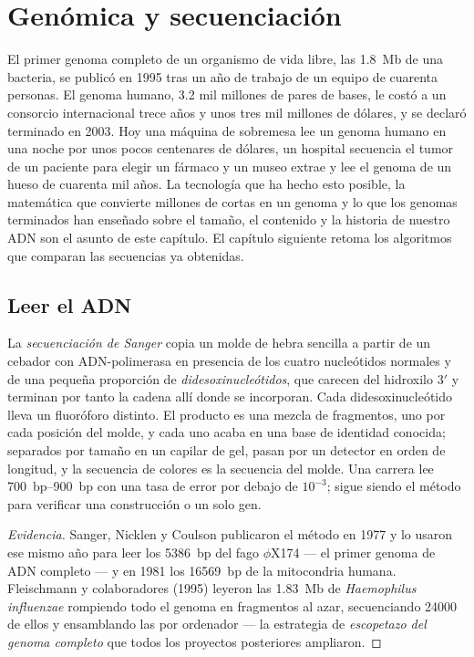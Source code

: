 \chapter{Genómica y secuenciación}\label{ch:b3:genomics}

El primer genoma completo de un organismo de vida libre, las
\qty{1.8}{Mb} de una bacteria, se publicó en 1995 tras un año de trabajo
de un equipo de cuarenta personas. El genoma humano, \num{3.2} mil
millones de pares de bases, le costó a un consorcio internacional trece
años y unos tres mil millones de dólares, y se declaró terminado en 2003.
Hoy una máquina de sobremesa lee un genoma humano en una noche por unos
pocos centenares de dólares, un hospital secuencia el tumor de un
paciente para elegir un fármaco y un museo extrae y lee el genoma de un
hueso de cuarenta mil años. La tecnología que ha hecho esto posible, la
matemática que convierte millones de  cortas en un genoma y lo
que los genomas terminados han enseñado sobre el tamaño, el contenido y
la historia de nuestro ADN son el asunto de este capítulo. El capítulo
siguiente retoma los algoritmos que comparan las secuencias ya obtenidas.

\section{Leer el ADN}

\begin{definition}\label{def:b3:genomics:sanger}
La \emph{secuenciación de Sanger} copia un molde de hebra sencilla a
partir de un cebador con ADN-polimerasa en presencia de los cuatro
nucleótidos normales y de una pequeña proporción de
\emph{didesoxinucleótidos}, que carecen del hidroxilo 3$'$ y terminan por
tanto la cadena allí donde se incorporan. Cada didesoxinucleótido lleva
un fluoróforo distinto. El producto es una mezcla de fragmentos, uno por
cada posición del molde, y cada uno acaba en una base de identidad
conocida; separados por tamaño en un capilar de gel, pasan por un
detector en orden de longitud, y la secuencia de colores es la secuencia
del molde. Una carrera lee \qtyrange{700}{900}{bp} con una tasa de error
por debajo de $10^{-3}$; sigue siendo el método para verificar una
construcción o un solo gen.
\end{definition}

\begin{proof}[Evidencia]
Sanger, Nicklen y Coulson publicaron el método en 1977 y lo usaron ese
mismo año para leer los \qty{5386}{bp} del fago $\phi$X174 --- el primer
genoma de ADN completo --- y en 1981 los \qty{16569}{bp} de la
mitocondria humana. Fleischmann y colaboradores (1995) leyeron las
\qty{1.83}{Mb} de \emph{Haemophilus influenzae} rompiendo todo el genoma
en fragmentos al azar, secuenciando \num{24000} de ellos y ensamblando
las  por ordenador --- la estrategia de \emph{escopetazo del
genoma completo} que todos los proyectos posteriores ampliaron.
\end{proof}

